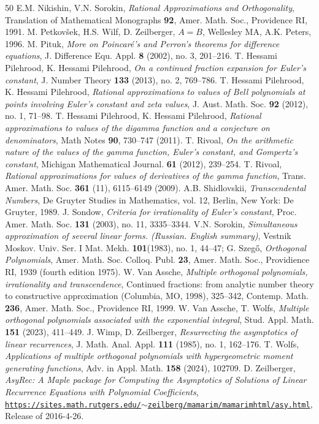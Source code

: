 \documentclass[a4paper,12pt,oneside]{article}
\theoremstyle{definition}
\begin{document}
\begin{thebibliography}{50}
 E.M. Nikishin, V.N. Sorokin,
\textit{Rational Approximations and Orthogonality},
Translation of Mathematical Monographs \textbf{92},
Amer. Math. Soc., Providence RI, 1991.
 M. Petkovšek, H.S. Wilf, D. Zeilberger,
$A=B$,
Wellesley MA, A.K. Peters, 1996.
 M. Pituk,
\textit{More on Poincaré's and Perron's theorems for difference equations},
J. Difference Equ. Appl. \textbf{8} (2002), no. 3, 201--216.
 T. Hessami Pilehrood, K. Hessami Pilehrood,
\textit{On a continued fraction expansion for Euler's constant}, 
J. Number Theory \textbf{133} (2013), no. 2, 769--786.
 T. Hessami Pilehrood, K. Hessami Pilehrood,
\textit{Rational approximations to values of Bell polynomials at points involving Euler's constant and zeta values}, 
J. Aust. Math. Soc. \textbf{92} (2012), no. 1, 71--98.
 T. Hessami Pilehrood, K. Hessami Pilehrood,
\textit{Rational approximations to values of the digamma function and a conjecture on denominators}, Math Notes \textbf{90}, 730--747 (2011).
 T. Rivoal, 
\textit{On the arithmetic nature of the values of the gamma function, Euler's constant, and Gompertz's constant},
Michigan Mathematical Journal. \textbf{61} (2012), 239--254.
 T. Rivoal, 
\textit{Rational approximations for values of derivatives of the gamma function}, 
Trans. Amer. Math. Soc. \textbf{361} (11), 6115–6149 (2009).
 A.B. Shidlovskii,
\textit{Transcendental Numbers},
De Gruyter Studies in Mathematics, vol. 12, Berlin, New York: De Gruyter, 1989.
 J. Sondow,
\textit{Criteria for irrationality of Euler's constant}, 
Proc. Amer. Math. Soc. \textbf{131} (2003), no. 11, 3335--3344.
 V.N. Sorokin, 
\textit{Simultaneous approximation of several linear forms. (Russian. English summary)}, 
Vestnik Moskov. Univ. Ser. I Mat. Mekh. \textbf{101}(1983), no. 1, 44--47; 
 G. Szeg\H{o},
 \textit{Orthogonal Polynomials},
 Amer. Math. Soc. Colloq. Publ. \textbf{23}, Amer. Math. Soc., Providience RI, 1939 (fourth edition 1975).
 W. Van Assche, 
\textit{Multiple orthogonal polynomials, irrationality and transcendence}, 
Continued fractions: from analytic number theory to constructive approximation (Columbia, MO, 1998), 325--342, Contemp. Math. \textbf{236}, Amer. Math. Soc., Providence RI, 1999.
 W. Van Assche, T. Wolfs,
\textit{Multiple orthogonal polynomials associated with the exponential integral},
Stud. Appl. Math. \textbf{151} (2023), 411--449.
 J. Wimp, D. Zeilberger,
\textit{Resurrecting the asymptotics of linear recurrences},
J. Math. Anal. Appl. \textbf{111} (1985), no. 1, 162--176.
 T. Wolfs, 
\textit{Applications of multiple orthogonal polynomials with hypergeometric moment generating functions},
Adv. in Appl. Math. \textbf{158} (2024), 102709.
 D. Zeilberger, 
\textit{AsyRec: A Maple package for Computing the Asymptotics of Solutions of Linear Recurrence Equations with Polynomial Coefficients}, 
\href{https://sites.math.rutgers.edu/~zeilberg/mamarim/mamarimhtml/asy.html}{\texttt{https://sites.math.rutgers.edu/$\sim$zeilberg/mamarim/mamarimhtml/asy.html}}, Release of 2016-4-26. 

\end{thebibliography}
\end{document}

